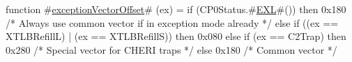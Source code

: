 function #\hyperref[sailMIPSzexceptionVectorOffset]{exceptionVectorOffset}# (ex) =
  if (CP0Status.#\hyperref[sailMIPSzEXL]{EXL}#()) then
    0x180 /* Always use common vector if in exception mode already */
  else if ((ex == XTLBRefillL) | (ex == XTLBRefillS)) then
    0x080
  else if (ex == C2Trap) then
    0x280 /* Special vector for CHERI traps */
  else
    0x180 /* Common vector */

